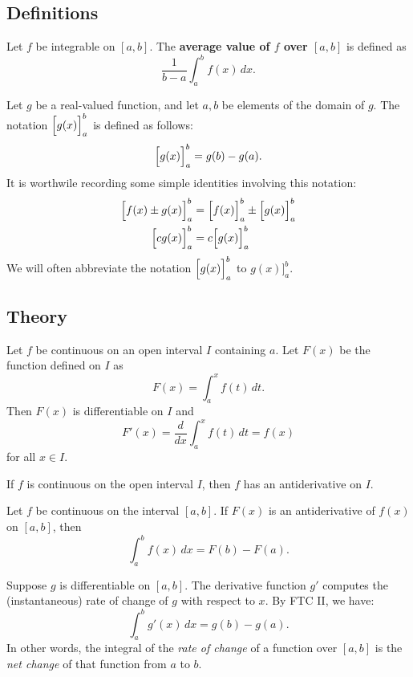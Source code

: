 \subsection*{Definitions}
\begin{namedtheorem} Let $f$ be integrable on $[a,b]$. The {\bf average value of $f$ over $[a,b]$} is defined as
  \[
  \frac{1}{b-a}\int_a^bf(x)\, dx.
  \]
\end{namedtheorem}
\begin{namedtheorem} Let $g$ be a real-valued function, and let $a,b$ be elements of the domain of $g$. The notation $\Bigl[g(x)\Bigr]_a^b$  is defined as follows:
  \[
  \Bigl[ g(x)\Bigr ]_a^b=g(b)-g(a).
  \]
  It is worthwile recording some simple identities involving this notation:
  \begin{align*}
    \Bigl[ f(x)\pm g(x)\Bigr ]_a^b&=\Bigl[f(x)\Bigr ]_a^b\pm \Bigl[ g(x)\Bigr ]_a^b\\
    \Bigl[ cg(x)\Bigr]_a^b&=c\Bigl[g(x)\Bigr]_a^b
  \end{align*}
  We will often abbreviate the notation $\Bigl[g(x)\Bigr]_a^b$ to $g(x)\Bigr]_a^b$.
\end{namedtheorem}

 \subsection*{Theory}
\begin{namedtheorem} Let $f$ be continuous on an open interval $I$ containing $a$. Let $F(x)$ be the function defined on $I$ as
  \[
  F(x)=\int_a^x f(t)\, dt.
  \]
Then $F(x)$ is differentiable on $I$ and
\[
F'(x)=\frac{d}{dx}\int_a^xf(t)\, dt=f(x)
\]
for all $x\in I$.
\end{namedtheorem}
\begin{corollary}
  If $f$ is continuous on the open interval $I$, then $f$ has an antiderivative on $I$.
\end{corollary}
\begin{namedtheorem} Let $f$ be continuous on the interval $[a,b]$. If $F(x)$ is an antiderivative of $f(x)$ on $[a,b]$, then
  \[
  \int_a^b f(x)\, dx=F(b)-F(a).
  \]

\end{namedtheorem}
\begin{namedtheorem} Suppose $g$ is differentiable on $[a,b]$. The derivative function $g'$ computes the (instantaneous) rate of change of $g$ with respect to $x$. By FTC II, we have:
  \[
  \int_a^b g'(x)\, dx=g(b)-g(a).
  \]
  In other words, the integral of the {\em rate of change} of a function over $[a,b]$ is the {\em net change} of that function from $a$ to $b$.

\end{namedtheorem}

